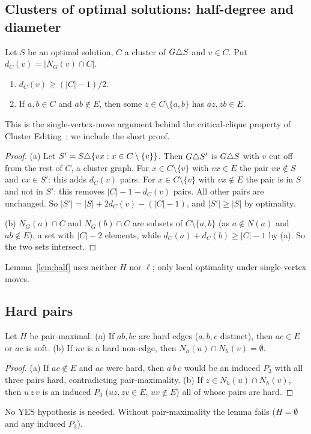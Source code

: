 \subsection{Clusters of optimal solutions: half-degree and diameter}
\begin{lemma}\label{lem:half}
Let $S$ be an optimal solution, $C$ a cluster of $G\triangle S$ and $v\in C$. Put $d_C(v)=|N_G(v)\cap C|$.
\begin{enumerate}
\item[(a)] $d_C(v)\ge(|C|-1)/2$.
\item[(b)] If $a,b\in C$ and $ab\notin E$, then some $z\in C\setminus\{a,b\}$ has $az,zb\in E$.
\end{enumerate}
\end{lemma}
This is the single-vertex-move argument behind the critical-clique property of Cluster Editing~\cite{Guo09,FLRS07}; we include the short proof.
\begin{proof}
(a) Let $S'=S\triangle\{vx:x\in C\setminus\{v\}\}$. Then $G\triangle S'$ is $G\triangle S$ with $v$ cut off from the rest of $C$, a cluster graph. For $x\in C\setminus\{v\}$ with $vx\in E$ the pair $vx\notin S$ and $vx\in S'$: this adds $d_C(v)$ pairs. For $x\in C\setminus\{v\}$ with $vx\notin E$ the pair is in $S$ and not in $S'$: this removes $|C|-1-d_C(v)$ pairs. All other pairs are unchanged. So $|S'|=|S|+2d_C(v)-(|C|-1)$, and $|S'|\ge|S|$ by optimality.

(b) $N_G(a)\cap C$ and $N_G(b)\cap C$ are subsets of $C\setminus\{a,b\}$ (as $a\notin N(a)$ and $ab\notin E$), a set with $|C|-2$ elements, while $d_C(a)+d_C(b)\ge|C|-1$ by (a). So the two sets intersect.
\end{proof}
Lemma~\ref{lem:half} uses neither $H$ nor $\ell$; only local optimality under single-vertex moves.

\subsection{Hard pairs}
\begin{lemma}[HE and H2]\label{lem:HE}\label{lem:H2}
Let $H$ be pair-maximal. (a) If $ab,bc$ are hard edges ($a,b,c$ distinct), then $ac\in E$ or $ac$ is soft. (b) If $uv$ is a hard non-edge, then $N_h(u)\cap N_h(v)=\emptyset$.
\end{lemma}
\begin{proof}
(a) If $ac\notin E$ and $ac$ were hard, then $a\,b\,c$ would be an induced $P_3$ with all three pairs hard, contradicting pair-maximality. (b) If $z\in N_h(u)\cap N_h(v)$, then $u\,z\,v$ is an induced $P_3$ ($uz,zv\in E$, $uv\notin E$) all of whose pairs are hard.
\end{proof}
No YES hypothesis is needed. Without pair-maximality the lemma fails ($H=\emptyset$ and any induced $P_3$).

